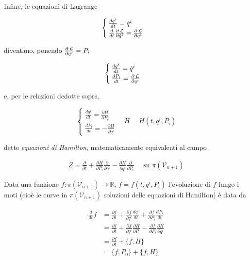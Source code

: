 Infine, le equazioni di Lagrange

\begin{equation*}
\begin{cases}
\frac{dq^i}{dt} = \dot{q}^i \\
\frac{d}{dt} \frac{\partial \operatorname{\mathcal{L}}}{\partial \dot{q}^i} = \frac{\partial \operatorname{\mathcal{L}}}{\partial q^i}
\end{cases}
\end{equation*}

diventano, ponendo $ \frac{\partial \operatorname{\mathcal{L}}}{\partial \dot{q}^i} = P_i $

\begin{equation*}
\begin{cases}
\frac{dq^i}{dt} = \dot{q}^i \\
\frac{dP_i}{dt} = \frac{\partial \operatorname{\mathcal{L}}}{\partial q^i}
\end{cases}
\end{equation*}

e, per le relazioni dedotte sopra, %

\begin{equation*}
\begin{cases}
\frac{dq^i}{dt} = \frac{\partial H}{\partial P_i} \\
\frac{dP_i}{dt} = - \frac{\partial H}{\partial q^i}
\end{cases}
\quad
H = H (t, q^i, P_i)
\end{equation*}

dette \textit{equazioni di Hamilton}, matematicamente equivalenti al campo

\begin{align*}
Z = \frac{\partial}{\partial t} + \frac{\partial H}{\partial P_i} \frac{\partial}{\partial q^i} - \frac{\partial H}{\partial q^i} \frac{\partial}{\partial P_i} \quad \text{ su } \pi(\mathcal{V}_{n + 1})
\end{align*}

Data una funzione $ f : \pi (\mathcal{V}_{n + 1}) \rightarrow \mathbb{R} $, $ f = f (t, q^i, P_i) $ l'evoluzione di $ f $ lungo i moti (cioè le curve in $ \pi(\mathcal{V}_{n + 1}) $ soluzioni delle equazioni di Hamilton) è data da

\begin{equation*}
\begin{split}
\frac{d}{d t} f &= \frac{\partial f}{\partial t} + \frac{\partial f}{\partial q^i} \frac{d q^i}{d t} + \frac{\partial f}{\partial P_i} \frac{d P_i}{d t} \\
&= \frac{\partial f}{\partial t} + \frac{\partial f}{\partial q^i} \frac{\partial H}{\partial P_i} - \frac{\partial f}{\partial P_i} \frac{\partial H}{\partial q^i} \\
&= \frac{\partial f}{\partial t} + \{ f, H \} \\
&= \{ f, P_0 \} + \{ f, H \}
\end{split}
\end{equation*}

